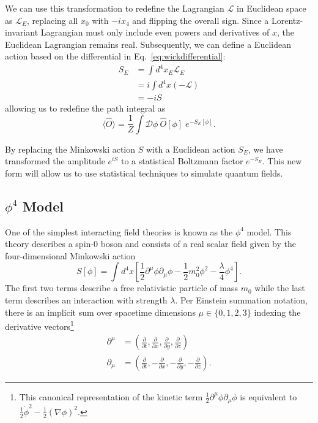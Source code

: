 We can use this transformation to redefine the Lagrangian $\mathcal{L}$ in Euclidean space as $\mathcal{L}_E$, replacing all $x_0$ with $-ix_4$ and flipping the overall sign. Since a Lorentz-invariant Lagrangian must only include even powers and derivatives of $x$, the Euclidean Lagrangian remains real. Subsequently, we can define a Euclidean action based on the differential in Eq.~\ref{eq:wickdifferential}:
\begin{align}
    S_E &= \int d^4x_E \mathcal{L}_E \nonumber\\
        &= i \int d^4x \left(-\mathcal{L}\right) \nonumber \\
    &= -i S
\end{align}
allowing us to redefine the path integral as 
\begin{equation}
    \label{eq:pathintegraleuclidean}
    \langle \hat O \rangle = \frac{1}{Z} \int \mathcal{D}\phi \: \hat O [\phi]\; e^{-S_E[\phi]}.
\end{equation}

By replacing the Minkowski action $S$ with a Euclidean action $S_E$, we have transformed the amplitude $e^{iS}$ to a statistical Boltzmann factor $e^{-S_E}$. This new form will allow us to use statistical techniques to simulate quantum fields.

\subsection{$\phi^4$ Model}
\label{sec:phi4}

One of the simplest interacting field theories is known as the $\phi^4$ model. This theory describes a spin-0 boson and consists of a real scalar field given by the four-dimensional Minkowski action
\begin{equation}
    \label{eq:phi4 action}
    S[\phi] = \int d^4 x \left[ \frac{1}{2}\partial^\mu \phi \partial_\mu\phi - \frac{1}{2} m_0^2 \phi^2 - \frac{\lambda}{4}\phi^4\right].
\end{equation}
The first two terms describe a free relativistic particle of mass $m_0$ while the last term describes an interaction with strength $\lambda$. Per Einstein summation notation, there is an implicit sum over spacetime dimensions $\mu\in\{0,1,2,3\}$ indexing the derivative vectors\footnote{This canonical representation of the kinetic term $\frac{1}{2}\partial^\mu\phi\partial_\mu\phi$ is equivalent to $\frac{1}{2}\dot\phi^2-\frac{1}{2}\left(\nabla \phi\right)^2$.}
\begin{align}
    \partial^\mu &= \left( \frac{\partial}{\partial t}, \frac{\partial}{\partial x},\frac{\partial}{\partial y}, \frac{\partial}{\partial z} \right) \\
    \partial_\mu &= \left( \frac{\partial}{\partial t}, -\frac{\partial}{\partial x}, -\frac{\partial}{\partial y}, -\frac{\partial}{\partial z} \right).
\end{align}

